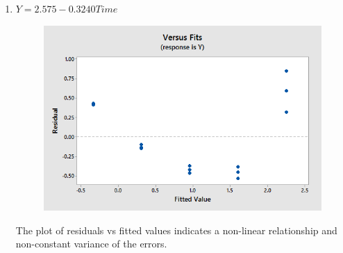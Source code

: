 \documentclass{article}
\providecommand{\tightlist}{%
      \setlength{\itemsep}{0pt}\setlength{\parskip}{0pt}}
\begin{document}
\begin{enumerate}
\def\labelenumi{\alph{enumi})}
\setcounter{enumi}{1}
\tightlist
\item
  \(Y = 2.575 - 0.3240 Time\)
  
  \begin{figure}[h!]
 \centering
 \includegraphics[scale=.5]{./images/scatterplot_residual-vs-fits_y-vs-time.png}
\end{figure}

The plot of residuals vs fitted values indicates a non-linear
relationship and non-constant variance of the errors.
\end{enumerate}
\end{document}
